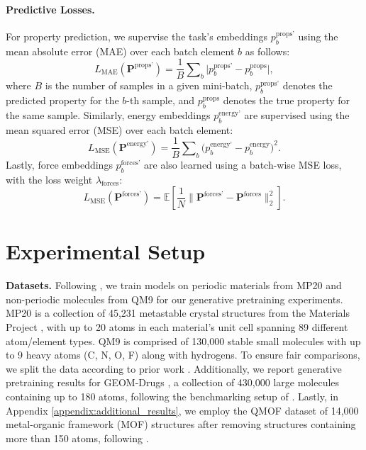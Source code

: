 \documentclass{article}
\theoremstyle{plain}
\theoremstyle{definition}
\theoremstyle{remark}
\begin{document}
\paragraph{Predictive Losses.} For property prediction, we supervise the task's embeddings \( p_b^\text{props'} \) using the mean absolute error (MAE) over each batch element \( b \) as follows:
\begin{equation}
    L_{\text{MAE}}(\bm{P}^\text{props'}) = \frac{1}{B} \sum\nolimits_b \big|p_b^\text{props'} - p_b^\text{props}\big|,
\end{equation}
where \( B \) is the number of samples in a given mini-batch, \( p_b^\text{props'} \) denotes the predicted property for the \( b \)-th sample, and \( p_b^\text{props} \) denotes the true property for the same sample. Similarly, energy embeddings $p_b^\text{energy'}$ are supervised using the mean squared error (MSE) over each batch element:
\begin{equation}
    L_{\text{MSE}}(\bm{P}^\text{energy'}) = \frac{1}{B} \sum\nolimits_b \big(p_b^\text{energy'} - p_b^\text{energy}\big)^2.
\end{equation}
Lastly, force embeddings $p_b^\text{forces'}$ are also learned using a batch-wise MSE loss, with the loss weight $\lambda_\text{forces}$:
\begin{equation}
    L_{\text{MSE}}(\bm{P}^\text{forces'}) = \mathbb{E} \left[ \frac{1}{N} \| \bm{P}^\text{forces'} - \bm{P}^\text{forces} \|_2^2 \right].
\end{equation}

\section{Experimental Setup}
\label{section:experimental_setup}

\textbf{Datasets.} Following \citet{joshi2025allatom}, we train models on periodic materials from MP20 and non-periodic molecules from QM9 for our generative pretraining experiments. MP20 \citep{xie2022crystal} is a collection of 45,231 metastable crystal structures from the Materials Project \citep{jain2013commentary}, with up to 20 atoms in each material's unit cell spanning 89 different atom/element types. QM9 \citep{wu2018moleculenet} is comprised of 130,000 stable small molecules with up to 9 heavy atoms (C, N, O, F) along with hydrogens. To ensure fair comparisons, we split the data according to prior work \citep{xie2022crystal, hoogeboom2022equivariant}. Additionally, we report generative pretraining results for GEOM-Drugs \citep{axelrod2022geom}, a collection of 430,000 large molecules containing up to 180 atoms, following the benchmarking setup of \citet{vignac2023midi}. Lastly, in Appendix \ref{appendix:additional_results}, we employ the QMOF dataset of 14,000 metal-organic framework (MOF) structures \citep{rosen2021machine} after removing structures containing more than 150 atoms, following \citet{joshi2025allatom}.
\end{document}
